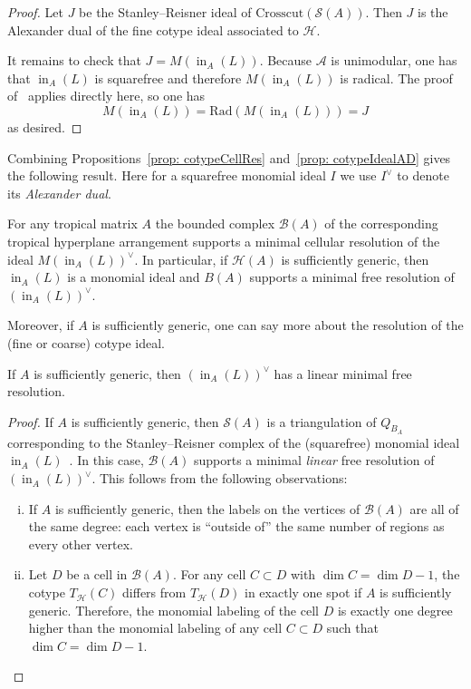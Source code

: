 \documentclass[11pt]{article}
\theoremstyle{definition}
\numberwithin{equation}{section}
\newcommand{\cA}{\mathcal{A}}
\newcommand{\cB}{\mathcal{B}}
\newcommand{\cH}{\mathcal{H}}
\newcommand{\cS}{\mathcal{S}}
\newcommand{\inn}{\operatorname{in}}
\begin{document}
\begin{proof}
Let $J$ be the Stanley--Reisner ideal of $\textrm{Crosscut}(\cS(A))$. Then $J$ is the Alexander dual of the fine cotype ideal associated to $\cH$.

It remains to check that $J = M(\inn_A(L))$. Because $\cA$ is unimodular, one has that $\inn_A(L)$ is squarefree and therefore $M(\inn_A(L))$ is radical. The proof of~\cite[Lemma 6.7]{dochtermann2012tropical} applies directly here, so one has
$$
M(\inn_A(L)) = \textrm{Rad}(M(\inn_A(L))) = J
$$
as desired.
\end{proof}

Combining Propositions~\ref{prop: cotypeCellRes} and~\ref{prop: cotypeIdealAD} gives the following result.  Here for a squarefree monomial ideal $I$ we use $I^\vee$ to denote its \emph{Alexander dual}.

\begin{cor}\label{cor: cellResDual} For any tropical matrix $A$ the bounded complex $\cB(A)$ of the corresponding tropical hyperplane arrangement supports a minimal cellular resolution of the ideal $M(\inn_A(L))^\vee$. In particular, if $\cH(A)$ is sufficiently generic, then $\inn_A(L)$ is a monomial ideal and $B(A)$ supports a minimal free resolution of $(\inn_A(L))^\vee$.
\end{cor}

Moreover, if $A$ is sufficiently generic, one can say more about the resolution of the (fine or coarse) cotype ideal.

\begin{cor}\label{cor: linearRes} If $A$ is sufficiently generic, then $(\inn_A(L))^\vee$ has a linear minimal free resolution.
\end{cor}

\begin{proof} 
If $A$ is sufficiently generic, then $\cS(A)$ is a triangulation of $Q_{B_A}$ corresponding to the Stanley--Reisner complex of the (squarefree) monomial ideal $\inn_A(L)$~\cite[Theorem 8.3]{sturmfels1996grobner}.
In this case, $\cB(A)$ supports a minimal \emph{linear} free resolution of $(\inn_A(L))^\vee$. This follows from the following observations:
\begin{enumerate}[(i)]
    \item If $A$ is sufficiently generic, then the labels on the vertices of $\cB(A)$ are all of the same degree: each vertex is ``outside of'' the same number of regions as every other vertex.
    \item Let $D$ be a cell in $\cB(A)$. For any cell $C\subset D$ with $\dim C = \dim D - 1$, the cotype $T_{\cH}(C)$ differs from $T_{\cH}(D)$ in exactly one spot if $A$ is sufficiently generic. Therefore, the monomial labeling of the cell $D$ is exactly one degree higher than the monomial labeling of any cell $C\subset D$ such that $\dim C = \dim D - 1$.
\end{enumerate}
\end{proof}
\end{document}
